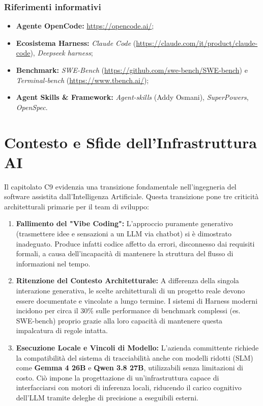 \documentclass[a4paper, 11pt]{article}
\begin{document}
\subsubsection{Riferimenti informativi}
\begin{itemize}[noitemsep]
    \item \textbf{Agente OpenCode:} \url{https://opencode.ai/};
    \item \textbf{Ecosistema Harness:} \textit{Claude Code} (\url{https://claude.com/it/product/claude-code}), \textit{Deepseek harness};
    \item \textbf{Benchmark:} \textit{SWE-Bench} (\url{https://github.com/swe-bench/SWE-bench}) e \textit{Terminal-bench} (\url{https://www.tbench.ai/});
    \item \textbf{Agent Skills \& Framework:} \textit{Agent-skills} (Addy Osmani), \textit{SuperPowers}, \textit{OpenSpec}.
\end{itemize}

\newpage
\section{Contesto e Sfide dell'Infrastruttura AI}

Il capitolato C9 evidenzia una transizione fondamentale nell'ingegneria del software assistita dall'Intelligenza Artificiale. Questa transizione pone tre criticità architetturali primarie per il team di sviluppo:

\begin{enumerate}
    \item \textbf{Fallimento del "Vibe Coding":} L'approccio puramente generativo (trasmettere idee e sensazioni a un LLM via chatbot) si è dimostrato inadeguato. Produce infatti codice affetto da errori, disconnesso dai requisiti formali, a causa dell'incapacità di mantenere la struttura del flusso di informazioni nel tempo.
    \item \textbf{Ritenzione del Contesto Architetturale:} A differenza della singola interazione generativa, le scelte architetturali di un progetto reale devono essere documentate e vincolate a lungo termine. I sistemi di Harness moderni incidono per circa il 30\% sulle performance di benchmark complessi (es. SWE-bench) proprio grazie alla loro capacità di mantenere questa impalcatura di regole intatta.
    \item \textbf{Esecuzione Locale e Vincoli di Modello:} L'azienda committente richiede la compatibilità del sistema di tracciabilità anche con modelli ridotti (SLM) come \textbf{Gemma 4 26B} e \textbf{Qwen 3.8 27B}, utilizzabili senza limitazioni di costo. Ciò impone la progettazione di un'infrastruttura capace di interfacciarsi con motori di inferenza locali, riducendo il carico cognitivo dell'LLM tramite deleghe di precisione a eseguibili esterni.
\end{enumerate}
\end{document}
